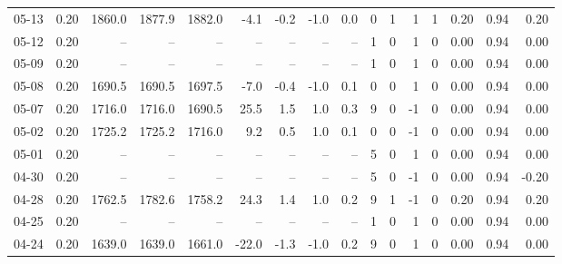 \begin{threeparttable}
{\begin{tabular}{lrrrrrrrrrrrrrrr}
  05-13 &     0.20 & 1860.0 & 1877.9 & 1882.0 &       -4.1 &           -0.2 &                     -1.0 &                 0.0 &              0 &         1 &     1 &         1 &       0.20 &      0.94 &           0.20 \\
  05-12 &     0.20 &     -- &     -- &     -- &         -- &             -- &                       -- &                  -- &              1 &         0 &     1 &         0 &       0.00 &      0.94 &           0.00 \\
  05-09 &     0.20 &     -- &     -- &     -- &         -- &             -- &                       -- &                  -- &              1 &         0 &     1 &         0 &       0.00 &      0.94 &           0.00 \\
  05-08 &     0.20 & 1690.5 & 1690.5 & 1697.5 &       -7.0 &           -0.4 &                     -1.0 &                 0.1 &              0 &         0 &     1 &         0 &       0.00 &      0.94 &           0.00 \\
  05-07 &     0.20 & 1716.0 & 1716.0 & 1690.5 &       25.5 &            1.5 &                      1.0 &                 0.3 &              9 &         0 &    -1 &         0 &       0.00 &      0.94 &           0.00 \\
  05-02 &     0.20 & 1725.2 & 1725.2 & 1716.0 &        9.2 &            0.5 &                      1.0 &                 0.1 &              0 &         0 &    -1 &         0 &       0.00 &      0.94 &           0.00 \\
  05-01 &     0.20 &     -- &     -- &     -- &         -- &             -- &                       -- &                  -- &              5 &         0 &     1 &         0 &       0.00 &      0.94 &           0.00 \\
  04-30 &     0.20 &     -- &     -- &     -- &         -- &             -- &                       -- &                  -- &              5 &         0 &    -1 &         0 &       0.00 &      0.94 &          -0.20 \\
  04-28 &     0.20 & 1762.5 & 1782.6 & 1758.2 &       24.3 &            1.4 &                      1.0 &                 0.2 &              9 &         1 &    -1 &         0 &       0.20 &      0.94 &           0.20 \\
  04-25 &     0.20 &     -- &     -- &     -- &         -- &             -- &                       -- &                  -- &              1 &         0 &     1 &         0 &       0.00 &      0.94 &           0.00 \\
  04-24 &     0.20 & 1639.0 & 1639.0 & 1661.0 &      -22.0 &           -1.3 &                     -1.0 &                 0.2 &              9 &         0 &     1 &         0 &       0.00 &      0.94 &           0.00 \\

\end{tabular}}
\end{threeparttable}
